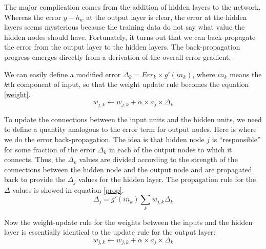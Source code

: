 \documentclass{mcmthesis}
\begin{document}
	The major complication comes from the addition of hidden layers to the network. Whereas the error ${y-h_{w}}$ at the output layer is clear, the error at the hidden layers seems mysterious because the training data do not say what value the hidden nodes should have. Fortunately, it turns out that we can back-propagate the error from the output layer to the hidden layers. The back-propagation progress emerges directly from a derivation of the overall error gradient.
	
	We can easily define a modified error $\Delta _{k}=Err _{k}\times g{}'\left ( in_{k} \right )$, where $in_{k}$ means the $k$th component of input, so that the weight update rule becomes the equation \ref{weight}.
	\begin{equation}
       \label{weight}
	    w_{j,k}\leftarrow w_{j,k}+\alpha \times a_{j} \times\Delta _{k}
	\end{equation}
	
	To update the connections between the input units and the hidden units, we need to define a quantity analogous to the error term for output nodes. Here is where we do the error back-propagation. The idea is that hidden node $j$ is ``responsible'' for some fraction of the error $\Delta _{k}$ in each of the output nodes to which it connects. Thus, the $\Delta _{k}$ values are divided according to the strength of the connections between the hidden node and the output node and are propagated back to provide the $\Delta_{j}$ values for the hidden layer. The propagation rule for the $\Delta$ values is showed in equation \ref{prop}.
	\begin{equation}
        \label{prop}
	    \Delta_{j} = g{}'\left ( in_{k} \right)\sum_{k}w_{j,k}\Delta_{k}
	\end{equation}

	Now the weight-update rule for the weights between the inputs and the hidden layer is essentially identical to the update rule for the output layer:
	\begin{equation}
	    w_{j,k}\leftarrow w_{j,k}+\alpha \times a_{j} \times\Delta _{k}
	\end{equation}
	
\end{document}
